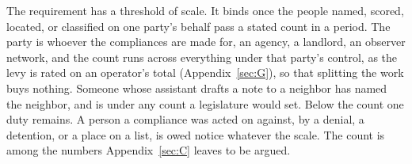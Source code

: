 The requirement has a threshold of scale. It binds once the people named, scored, located, or classified on one party's behalf pass a stated count in a period. The party is whoever the compliances are made for, an agency, a landlord, an observer network, and the count runs across everything under that party's control, as the levy is rated on an operator's total (Appendix~\ref{sec:G}), so that splitting the work buys nothing. Someone whose assistant drafts a note to a neighbor has named the neighbor, and is under any count a legislature would set. Below the count one duty remains. A person a compliance was acted on against, by a denial, a detention, or a place on a list, is owed notice whatever the scale. The count is among the numbers Appendix~\ref{sec:C} leaves to be argued.
